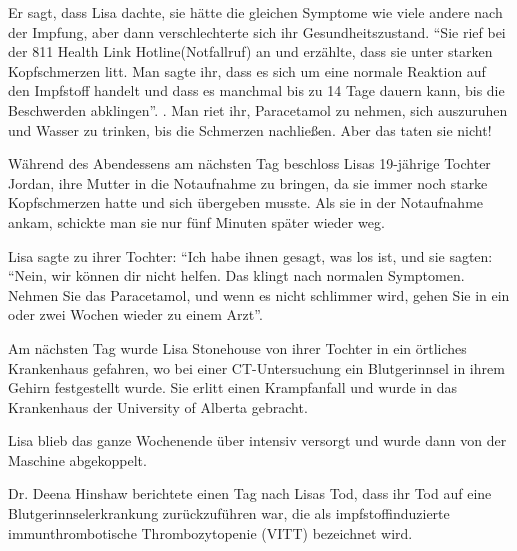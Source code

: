 

Er sagt, dass Lisa dachte, sie hätte die gleichen Symptome wie viele andere nach der Impfung, aber dann verschlechterte sich ihr Gesundheitszustand. “Sie rief bei der 811 Health Link Hotline(Notfallruf) an und erzählte, dass sie unter starken Kopfschmerzen litt. Man sagte ihr, dass es sich um eine normale Reaktion auf den Impfstoff handelt und dass es manchmal bis zu 14 Tage dauern kann, bis die Beschwerden abklingen”. . Man riet ihr, Paracetamol zu nehmen, sich auszuruhen und Wasser zu trinken, bis die Schmerzen nachließen. Aber das taten sie nicht!

Während des Abendessens am nächsten Tag beschloss Lisas 19-jährige Tochter Jordan, ihre Mutter in die Notaufnahme zu bringen, da sie immer noch starke Kopfschmerzen hatte und sich übergeben musste. Als sie in der Notaufnahme ankam, schickte man sie nur fünf Minuten später wieder weg.

Lisa sagte zu ihrer Tochter: “Ich habe ihnen gesagt, was los ist, und sie sagten: “Nein, wir können dir nicht helfen. Das klingt nach normalen Symptomen. Nehmen Sie das Paracetamol, und wenn es nicht schlimmer wird, gehen Sie in ein oder zwei Wochen wieder zu einem Arzt”.

Am nächsten Tag wurde Lisa Stonehouse von ihrer Tochter in ein örtliches Krankenhaus gefahren, wo bei einer CT-Untersuchung ein Blutgerinnsel in ihrem Gehirn festgestellt wurde. Sie erlitt einen Krampfanfall und wurde in das Krankenhaus der University of Alberta gebracht.

Lisa blieb das ganze Wochenende über intensiv versorgt und wurde dann von der Maschine abgekoppelt.

Dr. Deena Hinshaw berichtete einen Tag nach Lisas Tod, dass ihr Tod auf eine Blutgerinnselerkrankung zurückzuführen war, die als impfstoffinduzierte immunthrombotische Thrombozytopenie (VITT) bezeichnet wird.
